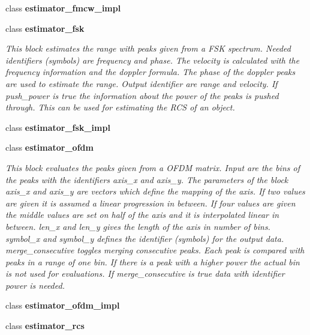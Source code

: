\begin{DoxyCompactItemize}
class {\bf estimator\+\_\+fmcw\+\_\+impl}
\item 
class {\bf estimator\+\_\+fsk}
\begin{DoxyCompactList}\small\item\em This block estimates the range with peaks given from a F\+SK spectrum. Needed identifiers (symbols) are \textquotesingle{}frequency\textquotesingle{} and \textquotesingle{}phase\textquotesingle{}. The velocity is calculated with the \textquotesingle{}frequency\textquotesingle{} information and the doppler formula. The phase of the doppler peaks are used to estimate the range. Output identifier are \textquotesingle{}range\textquotesingle{} and \textquotesingle{}velocity\textquotesingle{}. If push\+\_\+power is true the information about the power of the peaks is pushed through. This can be used for estimating the R\+CS of an object. \end{DoxyCompactList}\item 
class {\bf estimator\+\_\+fsk\+\_\+impl}
\item 
class {\bf estimator\+\_\+ofdm}
\begin{DoxyCompactList}\small\item\em This block evaluates the peaks given from a O\+F\+DM matrix. Input are the bins of the peaks with the identifiers \textquotesingle{}axis\+\_\+x\textquotesingle{} and \textquotesingle{}axis\+\_\+y\textquotesingle{}. The parameters of the block axis\+\_\+x and axis\+\_\+y are vectors which define the mapping of the axis. If two values are given it is assumed a linear progression in between. If four values are given the middle values are set on half of the axis and it is interpolated linear in between. len\+\_\+x and len\+\_\+y gives the length of the axis in number of bins. symbol\+\_\+x and symbol\+\_\+y defines the identifier (symbols) for the output data. merge\+\_\+consecutive toggles merging consecutive peaks. Each peak is compared with peaks in a range of one bin. If there is a peak with a higher power the actual bin is not used for evaluations. If merge\+\_\+consecutive is true data with identifier \textquotesingle{}power\textquotesingle{} is needed. \end{DoxyCompactList}\item 
class {\bf estimator\+\_\+ofdm\+\_\+impl}
\item 
class {\bf estimator\+\_\+rcs}

\end{DoxyCompactItemize}
